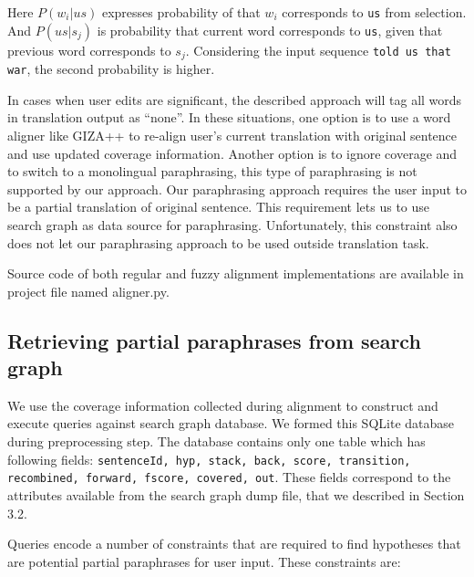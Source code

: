 Here $P(w_{i}|us)$ expresses probability of that $w_{i}$ corresponds to \texttt{us} from selection. And $P(us|s_{j})$ is probability that current word corresponds to \texttt{us}, given that previous word corresponds to $s_{j}$. Considering the input sequence \texttt{told us that war}, the second probability is higher.

In cases when user edits are significant, the described approach will tag all words in translation output as ``none''. In these situations, one option is to use a word aligner like GIZA++ to re-align user's current translation with original sentence and use updated coverage information. Another option is to ignore coverage and to switch to a monolingual paraphrasing, this type of paraphrasing is not supported by our approach. Our paraphrasing approach requires the user input to be a partial translation of original sentence. This requirement lets us to use search graph as data source for paraphrasing. Unfortunately, this constraint also does not let our paraphrasing approach to be used outside translation task.

Source code of both regular and fuzzy alignment implementations are available in project file named \textsf{aligner.py}. 

\subsection{Retrieving partial paraphrases from search graph}

We use the coverage information collected during alignment to construct and execute queries against search graph database. We formed this SQLite database during preprocessing step. The database contains only one table which has following fields: \texttt{sentenceId, hyp, stack, back, score, transition, recombined, forward, fscore, covered, out}. These fields correspond to the attributes available from the search graph dump file, that we described in Section 3.2. 

Queries encode a number of constraints that are required to find hypotheses that are potential partial paraphrases for user input. These constraints are:

